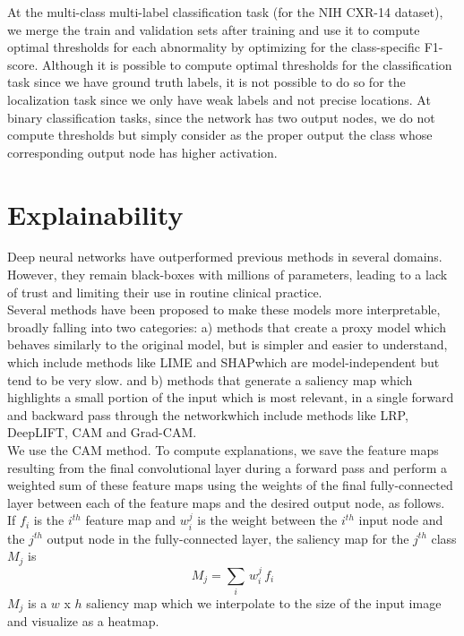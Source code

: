 \documentclass[oneside,a4paper]{article}
\begin{document}
At the multi-class multi-label classification task (for the NIH CXR-14 dataset),
we merge the train and validation sets after training and use it to compute
optimal thresholds for each abnormality by optimizing for the class-specific
F1-score. Although it is possible to compute optimal thresholds for the
classification task since we have ground truth labels, it is not possible to do
so for the localization task since
we only have weak labels and not precise locations. At binary classification tasks, since the network has two output nodes, we do
not compute thresholds but simply consider as the proper output the class whose
corresponding output node has higher activation.

\section{Explainability}
Deep neural networks have outperformed previous methods in several domains.
However, they remain black-boxes with millions of parameters, leading to a lack
of trust and limiting their use in routine clinical practice.\\

Several methods
have been proposed to make these models more interpretable, broadly falling into
two categories: a) methods that create a proxy model which behaves similarly to the original
model, but is simpler and easier to understand, which include methods like
LIME\cite{ribeiro2016should} and SHAP\cite{NIPS2017_7062}which are model-independent but tend to be very slow. and b) methods that generate a saliency map which highlights a small portion of
the input which is most relevant, in a single forward and backward pass
through the networkwhich include methods like LRP\cite{bach2015pixel},
DeepLIFT\cite{shrikumar2017learning}, CAM\cite{zhou2016learning} and
    Grad-CAM\cite{selvaraju2017grad}.\\

We use the CAM method. To compute explanations, we save the feature maps resulting from the final
convolutional layer during a forward pass and perform a weighted sum of these
feature maps using the weights of the final fully-connected layer between
each of the feature maps and the desired output node, as follows.\\

If $f_i$ is the $i^{th}$ feature map and $w^j _i$ is the weight between the
$i^{th}$ input node and the $j^{th}$ output node in the fully-connected layer,
the saliency map for the $j^{th}$ class $M_j$ is
\begin{equation}
  M_j = \sum _i \, w^j _i \, f_i
\end{equation}
$M_j$ is a $w$ x $h$ saliency map which we interpolate to the size of the input
image and visualize as a heatmap.\\
\end{document}

